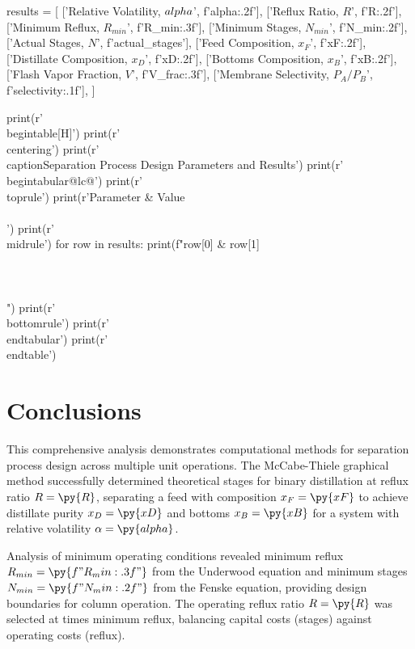 \documentclass[11pt,a4paper]{article}
\begin{document}
\begin{pycode}
results = [
    ['Relative Volatility, $\\alpha$', f'{alpha:.2f}'],
    ['Reflux Ratio, $R$', f'{R:.2f}'],
    ['Minimum Reflux, $R_{min}$', f'{R_min:.3f}'],
    ['Minimum Stages, $N_{min}$', f'{N_min:.2f}'],
    ['Actual Stages, $N$', f'{actual_stages}'],
    ['Feed Composition, $x_F$', f'{xF:.2f}'],
    ['Distillate Composition, $x_D$', f'{xD:.2f}'],
    ['Bottoms Composition, $x_B$', f'{xB:.2f}'],
    ['Flash Vapor Fraction, $V$', f'{V_frac:.3f}'],
    ['Membrane Selectivity, $P_A/P_B$', f'{selectivity:.1f}'],
]

print(r'\\begin{table}[H]')
print(r'\\centering')
print(r'\\caption{Separation Process Design Parameters and Results}')
print(r'\\begin{tabular}{@{}lc@{}}')
print(r'\\toprule')
print(r'Parameter & Value \\\\')
print(r'\\midrule')
for row in results:
    print(f"{row[0]} & {row[1]} \\\\\\\\")
print(r'\\bottomrule')
print(r'\\end{tabular}')
print(r'\\end{table}')
\end{pycode}

\section{Conclusions}

This comprehensive analysis demonstrates computational methods for separation process design across multiple unit operations. The McCabe-Thiele graphical method successfully determined  theoretical stages for binary distillation at reflux ratio $R = \py{R}$, separating a feed with composition $x_F = \py{xF}$ to achieve distillate purity $x_D = \py{xD}$ and bottoms $x_B = \py{xB}$ for a system with relative volatility $\alpha = \py{alpha}$.

Analysis of minimum operating conditions revealed minimum reflux $R_{min} = \py{f"{R_min:.3f}"}$ from the Underwood equation and minimum stages $N_{min} = \py{f"{N_min:.2f}"}$ from the Fenske equation, providing design boundaries for column operation. The operating reflux ratio $R = \py{R}$ was selected at  times minimum reflux, balancing capital costs (stages) against operating costs (reflux).
\end{document}
